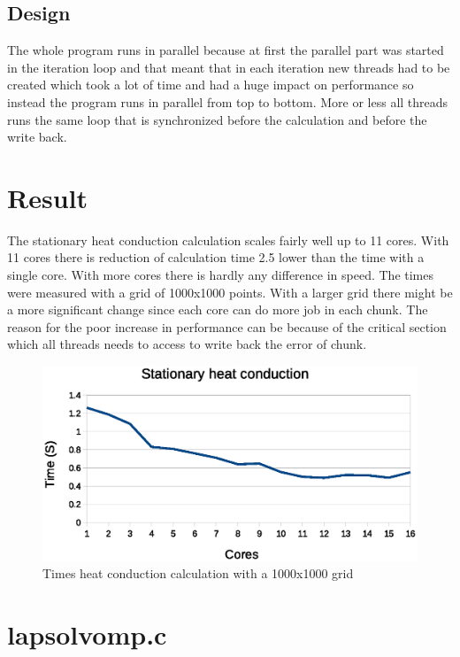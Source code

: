 \documentclass[10pt,twocolumn]{article}
\begin{document}
\subsection{Design}
The whole program runs in parallel because at first the parallel part was started in the iteration loop and that meant that in each iteration new threads had to be created which took a lot of time and had a huge impact on performance so instead the program runs in parallel from top to bottom. More or less all threads runs the same loop that is synchronized before the calculation and before the write back.

\section{Result}
The stationary heat conduction calculation scales fairly well up to 11 cores. With 11 cores there is reduction of calculation time 2.5 lower than the time with a single core. With more cores there is hardly any difference in speed.  The times were measured with a grid of 1000x1000 points. With a larger grid there might be a more significant change since each core can do more job in each chunk. The reason for the poor increase in performance can be because of the critical section which all threads needs to access to write back the error of chunk.
\begin{figure}[H]
	\begin{center}
		\includegraphics[scale=0.5]{figurer/heat.eps}
	\end{center}
	\caption{Times heat conduction calculation with a 1000x1000 grid}
\end{figure}


\newpage

\onecolumn
\appendix
\section{lapsolvomp.c} \label{app:blur}

\end{document}
